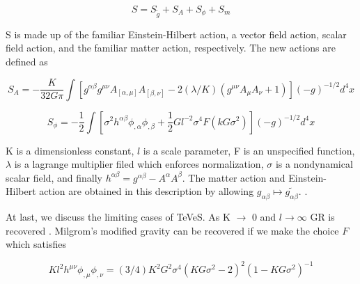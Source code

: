 \documentclass[12pt]{article}
\begin{document}
$$ S = S_{\tilde{g}} + S_{A} + S_{\phi} + S_{m} $$

S is made up of the familiar Einstein-Hilbert action, a vector field action, scalar field action, and the familiar matter action, respectively. The new actions are defined as

$$ S_{A} = -\frac{K}{32G\pi} \int [g^{\alpha \beta} g^{\mu \nu} A_{[\alpha, \mu]} A_{[\beta, \nu]} - 2(\lambda/K)(g^{\mu \nu} A_{\mu} A_{\nu} + 1 )]  (-g)^{-1/2} d^{4}x$$

$$ S_{\phi} = -\frac{1}{2} \int [\sigma^{2}h^{\alpha \beta} \phi_{,\alpha} \phi_{,\beta} + \frac{1}{2} Gl^{-2} \sigma^{4}F(kG\sigma^{2})] (-g)^{-1/2} d^{4}x$$

K is a dimensionless constant, $l$ is a scale parameter, F is an unspecified function, $\lambda$ is a lagrange multiplier filed which enforces normalization, $\sigma$ is a nondynamical scalar field, and finally $h^{\alpha \beta} = g^{\alpha \beta} - A^{\alpha} A^{\beta}$. The matter action and Einstein-Hilbert action are obtained in this description by allowing $g_{\alpha \beta} \mapsto \tilde{g_{\alpha \beta}}.$ \cite{Bekenstein2004}.

At last, we discuss the limiting cases of TeVeS. As K $\rightarrow$ 0 and $l \rightarrow \infty$ GR is recovered \cite{Bekenstein2004}. Milgrom's modified gravity can be recovered if we make the choice $F$ which satisfies

$$Kl^{2}h^{\mu \nu} \phi_{,\mu} \phi_{,\nu} = (3/4)K^{2}G^{2}\sigma^{4}(KG\sigma^{2}-2)^{2} (1 - KG\sigma^{2})^{-1} $$
\end{document}
